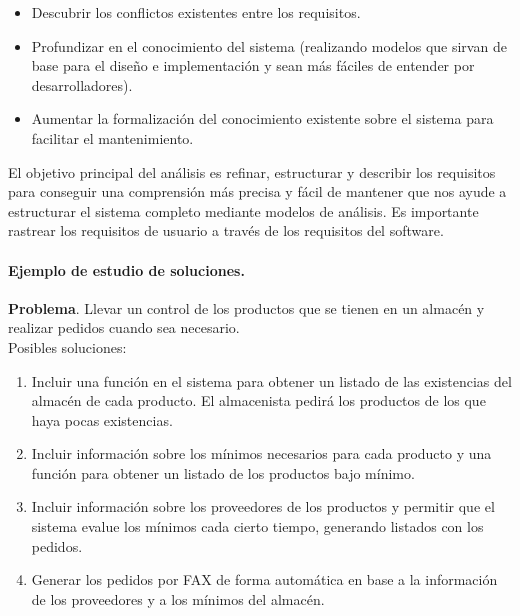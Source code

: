 \documentclass[12pt,spanish]{article}
\begin{document}
\begin{itemize}
	\item Descubrir los conflictos existentes entre los requisitos.
	\item Profundizar en el conocimiento del sistema (realizando modelos que sirvan de base para el diseño e implementación y sean más fáciles de entender por desarrolladores).
	\item Aumentar la formalización del conocimiento existente sobre el sistema para facilitar el mantenimiento.
\end{itemize}

El objetivo principal del análisis es refinar, estructurar y describir los requisitos para conseguir una comprensión más precisa y fácil de mantener que nos ayude a estructurar el sistema completo mediante modelos de análisis. Es importante rastrear los requisitos de usuario a través de los requisitos del software.

\paragraph{Ejemplo de estudio de soluciones.\\}

\textbf{Problema}. Llevar un control de los productos que se tienen en un almacén y realizar pedidos cuando sea necesario.\\

Posibles soluciones:

\begin{enumerate}
	\item Incluir una función en el sistema para obtener un listado de las existencias del almacén de cada producto. El almacenista pedirá los productos de los que haya pocas existencias.
	\item Incluir información sobre los mínimos necesarios para cada producto y una función para obtener un listado de los productos bajo mínimo.
	\item Incluir información sobre los proveedores de los productos y permitir que el sistema evalue los mínimos cada cierto tiempo, generando listados con los pedidos.
	\item Generar los pedidos por FAX de forma automática en base a la información de los proveedores y a los mínimos del almacén.
\end{enumerate}
\end{document}
